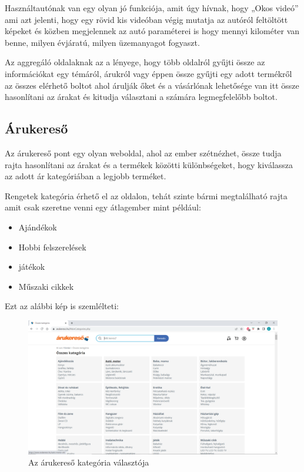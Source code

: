 Használtautónak van egy olyan jó funkciója, amit úgy hívnak, hogy „Okos videó” ami azt jelenti, hogy egy rövid kis videóban végig mutatja az autóról feltöltött képeket és közben megjelennek az autó paraméterei is hogy mennyi kilométer van benne, milyen évjáratú, milyen üzemanyagot fogyaszt. 


Az aggregáló oldalaknak az a lényege, hogy több oldalról gyűjti össze az információkat egy témáról, árukról vagy éppen össze gyűjti egy adott termékről az összes elérhető boltot ahol árulják őket és a vásárlónak lehetősége van itt össze hasonlítani az árakat és kitudja választani a számára legmegfelelőbb boltot.

\subsection{Árukereső}

Az árukereső pont egy olyan weboldal, ahol az ember szétnézhet, össze tudja rajta hasonlítani az árakat és a termékek közötti különbségeket, hogy kiválassza az adott ár kategóriában a legjobb terméket.

Rengetek kategória érhető el az oldalon, tehát szinte bármi megtalálható rajta amit csak szeretne venni egy átlagember mint például:

\begin{itemize}
\item Ajándékok
\item Hobbi felszerelések
\item játékok
\item Műszaki cikkek
\end{itemize}

Ezt az alábbi kép is szemlélteti:

\begin{figure}[h]
\centering
\includegraphics[scale=0.8]{images/arukereso.png}
\caption{Az árukereső kategória választója}
\label{fig:arukereso}
\end{figure}
\newpage